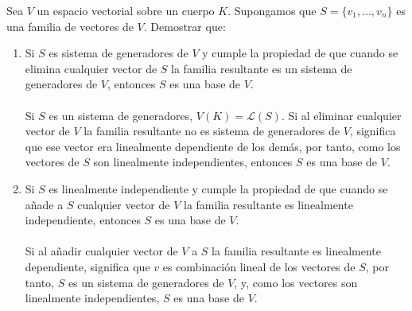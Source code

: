 \begin{ejercicio} Sea \( V \) un espacio vectorial sobre un cuerpo \( K \). Supongamos que \( S = \{v_1, \ldots, v_n\} \) es una familia de vectores de \( V \). Demostrar que:
	\begin{enumerate}
		\item Si \( S \) es sistema de generadores de \( V \) y cumple la propiedad de que cuando se elimina cualquier vector de \( S \) la familia resultante es un sistema de generadores de \( V \), entonces \( S \) es una base de \( V \).
		      \\ \\
		      Si $S$ es un sistema de generadores, $V(K) = \mathcal{L}(S)$. Si al eliminar cualquier vector de $V$ la familia
		      resultante no es sistema de generadores de $V$, significa que ese vector era linealmente dependiente de los demás,
		      por tanto, como los vectores de $S$ son linealmente independientes, entonces $S$ es una base de $V$.
		\item Si \( S \) es linealmente independiente y cumple la propiedad de que cuando se añade a \( S \) cualquier vector de \( V \) la familia resultante es linealmente independiente, entonces \( S \) es una base de \( V \).
		      \\ \\
		      Si al añadir cualquier vector de $V$ a $S$ la familia resultante es linealmente dependiente, significa que $v$ es combinación
		      lineal de los vectores de $S$, por tanto, $S$ es un sistema de generadores de $V$, y, como los vectores son linealmente independientes,
		      $S$ es una base de $V$.
	\end{enumerate}
\end{ejercicio}




